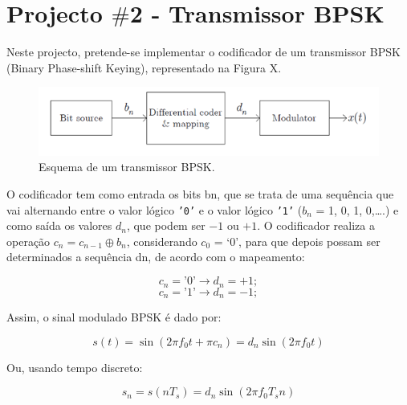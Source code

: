 \documentclass[11pt]{article}
\numberwithin{equation}{section}
\begin{document}

\section{Projecto $\#$2 - Transmissor BPSK}

Neste projecto, pretende-se implementar o codificador de um transmissor BPSK (Binary Phase-shift Keying), representado na Figura X.

\begin{figure}[H]
	\centering
	\includegraphics[keepaspectratio=true, scale=1.0]{teoricas/bpsk}
	\caption{Esquema de um transmissor BPSK.}
	\vspace{-0.8em}
\end{figure}


O codificador tem como entrada os bits bn, que se trata de uma sequência que vai alternando entre o valor lógico \texttt{'0'} e o valor lógico \texttt{'1'} ($b_n$ = 1, 0, 1, 0,….) e como saída os valores $d_n$, que podem ser $-1$ ou $+1$. O codificador realiza a operação $c_n = c_{n-1} \oplus b_n$, considerando $c_0$ = ‘0’, para que depois possam ser determinados a sequência dn, de acordo com o mapeamento:

\vspace{-3mm}
\begin{equation}
	c_{n} = \text{'}0\text{'}\to d_{n} = +1;   
\end{equation} 
\begin{equation}
c_{n} = \text{'}1\text{'}\to d_{n} = -1;
\end{equation}

Assim, o sinal modulado BPSK é dado por:

\vspace{-3mm}
\begin{equation}
	s(t) = \sin (2 \pi f_0 t + \pi c_n) = d_n \sin (2 \pi f_0 t) 
\end{equation} 

Ou, usando tempo discreto:

\vspace{-3mm}
\begin{equation}
	s_{n} = s(n T_s) = d_n \sin (2\pi f_0 T_s n)
\end{equation} 
\end{document}
